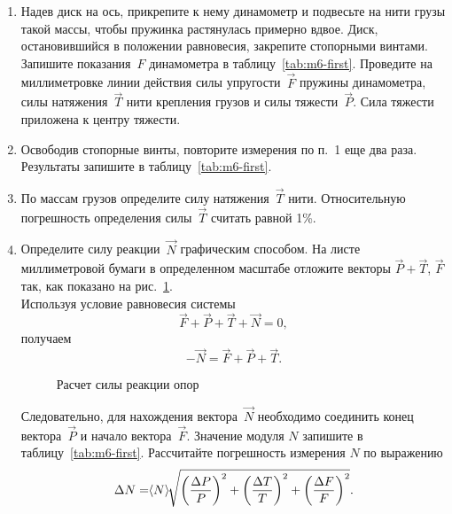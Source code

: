 \documentclass[a4paper, 12pt]{extarticle}
\begin{document}
\begin{enumerate}
\item Надев диск на ось, прикрепите к нему динамометр и подвесьте на нити грузы такой массы, чтобы пружинка растянулась примерно вдвое. Диск, остановившийся в положении равновесия, закрепите стопорными винтами. Запишите показания~$F$ динамометра в таблицу~\ref{tab:m6-first}. Проведите на миллиметровке линии действия силы упругости~$\vec{F}$ пружины динамометра, силы натяжения~$\vec{T}$ нити крепления грузов и силы тяжести~$\vec{P}$. Сила тяжести приложена к центру тяжести. 
\item Освободив стопорные винты, повторите измерения по п.~1 еще два раза. Результаты запишите в таблицу~\ref{tab:m6-first}.
\item По массам грузов определите силу натяжения~$\vec{T}$ нити. Относительную погрешность определения силы~$\vec{T}$ считать равной 1\%. 
\item Определите силу реакции~$\vec{N}$ графическим способом. На листе миллиметровой бумаги в определенном масштабе отложите векторы $\vec{P} + \vec{T}$, $\vec{F}$ так, как показано на рис.~\ref{fig:m6-scheme}. \\
Используя условие равновесия системы
\begin{equation}
\label{eq:m6-balance}
\vec{F} + \vec{P} + \vec{T} + \vec{N} = 0,
\end{equation}
получаем
\begin{equation}
\label{eq:m6-reaction-force}
-\vec{N} = \vec{F} + \vec{P} + \vec{T}.
\end{equation}

\begin{figure}[h]
\begin{center}
\end{center}
\caption{Расчет силы реакции опор \label{fig:m6-scheme}}
\end{figure}

Следовательно, для нахождения вектора~$\vec{N}$ необходимо соединить конец вектора~$\vec{P}$ и начало вектора~$\vec{F}$. Значение модуля $N$ запишите в таблицу~\ref{tab:m6-first}. Рассчитайте погрешность измерения $N$ по выражению
\begin{equation}
\label{eq:m6-reaction-force-error}
\Delta N = \hspace{-3pt}\left<N\right>\hspace{-3pt} \sqrt{\left( \frac{\Delta P}{P} \right) ^2 + \left( \frac{\Delta T}{T} \right) ^2 + \left( \frac{\Delta F}{F} \right) ^2}.
\end{equation}
\end{enumerate}
\end{document}
